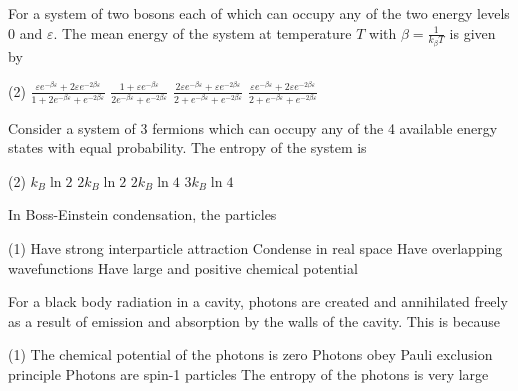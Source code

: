 \begin{enumerate}
\item For a system of two bosons each of which can occupy any of the two energy levels 0 and $\varepsilon$. The mean energy of the system at temperature $T$ with $\beta=\frac{1}{k_{\beta} T}$ is given by
{}

\begin{tasks}(2)
	\task[\textbf{A.}] $\frac{\varepsilon e^{-\beta \varepsilon}+2 \varepsilon e^{-2 \beta \varepsilon}}{1+2 e^{-\beta \varepsilon}+e^{-2 \beta \varepsilon}}$
	\task[\textbf{B.}] $\frac{1+\varepsilon e^{-\beta \varepsilon}}{2 e^{-\beta \varepsilon}+e^{-2 \beta \varepsilon}}$
	\task[\textbf{C.}] $\frac{2 \varepsilon e^{-\beta \varepsilon}+\varepsilon e^{-2 \beta \varepsilon}}{2+e^{-\beta \varepsilon}+e^{-2 \beta \varepsilon}}$
	\task[\textbf{D.}] $\frac{\varepsilon e^{-\beta \varepsilon}+2 \varepsilon e^{-2 \beta \varepsilon}}{2+e^{-\beta \varepsilon}+e^{-2 \beta \varepsilon}}$
\end{tasks}

\begin{minipage}{\textwidth}
	\item Consider a system of 3 fermions which can occupy any of the 4 available energy states with equal probability. The entropy of the system is
	{}
\end{minipage}
\begin{tasks}(2)
	\task[\textbf{A.}] $k_{B} \ln 2$
	\task[\textbf{B.}] $2 k_{B} \ln 2$
	\task[\textbf{C.}]  $2 k_{B} \ln 4$
	\task[\textbf{D.}]  $3 k_{B} \ln 4$
\end{tasks}
\item In Boss-Einstein condensation, the particles
{}
\begin{tasks}(1)
	\task[\textbf{A.}] Have strong interparticle attraction
	\task[\textbf{B.}] Condense in real space
	\task[\textbf{C.}]  Have overlapping wavefunctions
	\task[\textbf{D.}] Have large and positive chemical potential
\end{tasks}

\begin{minipage}{\textwidth}
	\item For a black body radiation in a cavity, photons are created and annihilated freely as a result of emission and absorption by the walls of the cavity. This is because
	{}
\end{minipage}
\begin{tasks}(1)
	\task[\textbf{A.}] The chemical potential of the photons is zero
	\task[\textbf{B.}] Photons obey Pauli exclusion principle
	\task[\textbf{C.}] Photons are spin-1 particles
	\task[\textbf{D.}] The entropy of the photons is very large
\end{tasks}


\end{enumerate}
